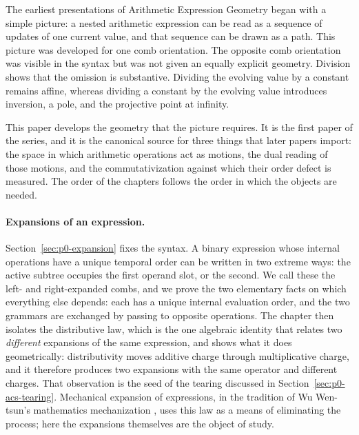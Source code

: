 The earliest presentations of Arithmetic Expression Geometry began with a
simple picture: a nested arithmetic expression can be read as a sequence of
updates of one current value, and that sequence can be drawn as a path.  This
picture was developed for one comb orientation.  The opposite comb orientation
was visible in the syntax but was not given an equally explicit geometry.
Division shows that the omission is substantive.  Dividing the evolving value
by a constant remains affine, whereas dividing a constant by the evolving
value introduces inversion, a pole, and the projective point at infinity.

This paper develops the geometry that the picture requires.  It is the first
paper of the series, and it is the canonical source for three things that later
papers import: the space in which arithmetic operations act as motions, the
dual reading of those motions, and the commutativization against which their
order defect is measured.  The order of the chapters follows the order in which
the objects are needed.

\paragraph{Expansions of an expression.}
Section~\ref{sec:p0-expansion} fixes the syntax.  A binary expression whose
internal operations have a unique temporal order can be written in two extreme
ways: the active subtree occupies the first operand slot, or the second.  We
call these the left- and right-expanded combs, and we prove the two elementary
facts on which everything else depends: each has a unique internal evaluation
order, and the two grammars are exchanged by passing to opposite operations.
The chapter then isolates the distributive law, which is the one algebraic
identity that relates two \emph{different} expansions of the same expression, and
shows what it does geometrically: distributivity moves additive charge through
multiplicative charge, and it therefore produces two expansions with the same
operator and different charges.  That observation is the seed of the tearing
discussed in Section~\ref{sec:p0-acs-tearing}.  Mechanical expansion of
expressions, in the tradition of Wu Wen-tsun's mathematics mechanization
\cite{Wu2000MathematicsMechanization}, uses this law as a means of eliminating
the process; here the expansions themselves are the object of study.


